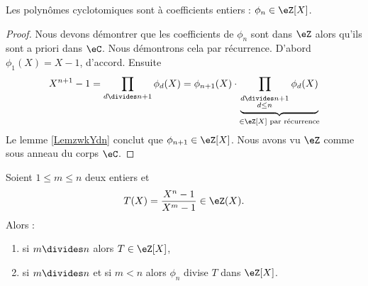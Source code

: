 \begin{proposition}
    Les polynômes cyclotomiques sont à coefficients entiers : \( \phi_n\in \eZ[X]\).
\end{proposition}

\begin{proof}
            Nous devons démontrer que les coefficients de \( \phi_n\) sont dans \( \eZ\) alors qu'ils sont a priori dans \( \eC\). Nous démontrons cela par récurrence. D'abord \( \phi_1(X)=X-1\), d'accord. Ensuite
            \begin{equation}
                X^{n+1}-1=\prod_{d\divides n+1}\phi_d(X)=\phi_{n+1}(X)\cdot\underbrace{\prod_{_{\substack{d\divides n+1\\d\leq n}}}\phi_d(X)}_{\in\eZ[X]\text{ par récurrence}}
            \end{equation}
            Le lemme \ref{LemzwkYdn} conclut que \( \phi_{n+1}\in \eZ[X]\). Nous avons vu \( \eZ\) comme sous anneau du corps \( \eC\).
\end{proof}

\begin{proposition}     \label{PropUImYnL}
    Soient \( 1\leq m\leq n\) deux entiers et
    \begin{equation}
        T(X)=\frac{ X^n-1 }{ X^m-1 }\in \eZ(X).
    \end{equation}
    Alors :
    \begin{enumerate}
        \item   \label{ItemhpDPKE}
            si \( m\divides n\) alors \( T\in \eZ[X]\),
        \item
            si \( m\divides n\) et si \( m<n\) alors \( \phi_n\) divise \( T\) dans \( \eZ[X]\).
    \end{enumerate}
\end{proposition}


